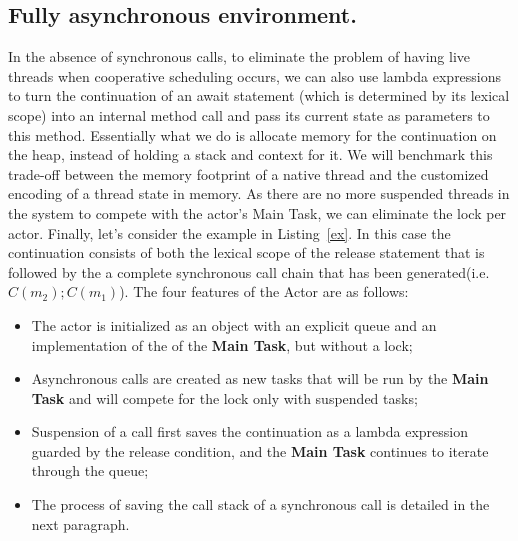 \subsection{Fully asynchronous environment.}
In the absence of synchronous calls, to eliminate the problem of having live threads when cooperative scheduling occurs, we can also use lambda expressions to turn the continuation of an await statement (which is determined by its lexical scope) into an internal method call and pass its current state as parameters to this method. Essentially what we do is allocate memory for the continuation on the heap, instead of holding a stack and context for it. We will benchmark this trade-off between the memory footprint of a native thread and the customized encoding of a thread state in memory. As there are no more suspended threads in the system to compete with the actor's Main Task, we can eliminate the lock per actor. Finally, let's consider the example in Listing~\ref{ex}. In this case the continuation consists of both the lexical scope of the release statement that is followed by the a complete synchronous call chain that has been generated(i.e. $C(m_2);C(m_1)$). The four features of the Actor are as follows:

\begin{itemize}
	\item The actor is initialized as an object with an explicit queue and an implementation of the of the \textbf{Main Task}, but without a lock;
	\item Asynchronous calls are created as new tasks that will be run by the \textbf{Main Task} and will compete for the lock only with suspended tasks;
	\item Suspension of a call first saves the continuation as a lambda expression guarded by the release condition, and the \textbf{Main Task} continues to iterate through the queue;
	\item The process of saving the call stack of a synchronous call is detailed in the next paragraph.
\end{itemize}



 

